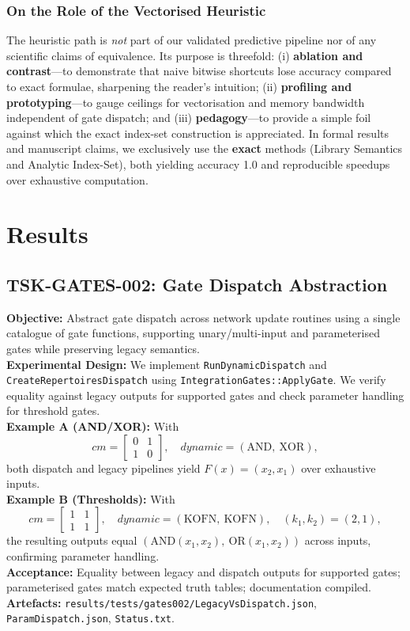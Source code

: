 \documentclass{article}
\begin{document}
\subsubsection*{On the Role of the Vectorised Heuristic}
The heuristic path is \emph{not} part of our validated predictive pipeline nor of any scientific claims of equivalence. Its purpose is threefold: (i) \textbf{ablation and contrast}—to demonstrate that naive bitwise shortcuts lose accuracy compared to exact formulae, sharpening the reader’s intuition; (ii) \textbf{profiling and prototyping}—to gauge ceilings for vectorisation and memory bandwidth independent of gate dispatch; and (iii) \textbf{pedagogy}—to provide a simple foil against which the exact index-set construction is appreciated. In formal results and manuscript claims, we exclusively use the \textbf{exact} methods (Library Semantics and Analytic Index-Set), both yielding accuracy 1.0 and reproducible speedups over exhaustive computation.\\
\section{Results}
\subsection{TSK-GATES-002: Gate Dispatch Abstraction}
\textbf{Objective:} Abstract gate dispatch across network update routines using a single catalogue of gate functions, supporting unary/multi-input and parameterised gates while preserving legacy semantics.\\
\textbf{Experimental Design:} We implement \texttt{RunDynamicDispatch} and \texttt{CreateRepertoiresDispatch} using \texttt{Integration\textasciigrave Gates::ApplyGate}. We verify equality against legacy outputs for supported gates and check parameter handling for threshold gates.\\
\textbf{Example A (AND/XOR):} With
\[
cm = \begin{bmatrix}0 & 1\\ 1 & 0\end{bmatrix},\quad dynamic=(\text{AND},\ \text{XOR}),
\]
both dispatch and legacy pipelines yield \(F(x)=(x_2,x_1)\) over exhaustive inputs.\\
\textbf{Example B (Thresholds):} With
\[
cm = \begin{bmatrix}1 & 1\\ 1 & 1\end{bmatrix},\quad dynamic=(\text{KOFN},\ \text{KOFN}),\quad (k_1, k_2)=(2,1),
\]
the resulting outputs equal \((\text{AND}(x_1,x_2),\ \text{OR}(x_1,x_2))\) across inputs, confirming parameter handling.\\
\textbf{Acceptance:} Equality between legacy and dispatch outputs for supported gates; parameterised gates match expected truth tables; documentation compiled.\\
\textbf{Artefacts:} \texttt{results/tests/gates002/LegacyVsDispatch.json}, \texttt{ParamDispatch.json}, \texttt{Status.txt}.
\end{document}
